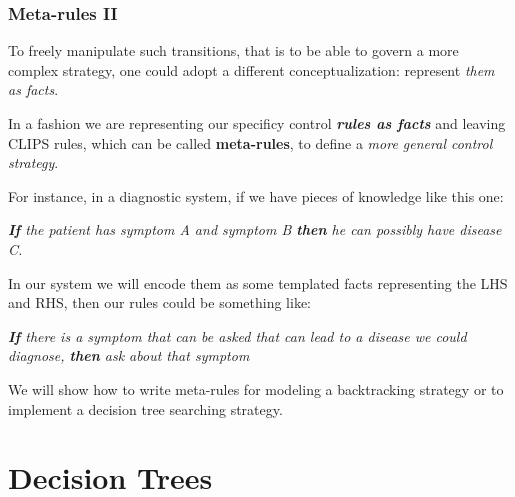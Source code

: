 \documentclass[xcolor={usenames,dvipsnames,svgnames}, compress]{beamer}
\begin{document}
\begin{frame}
  \frametitle{Meta-rules II}
  To freely manipulate such transitions, that is to be able to govern a
  more complex strategy, one could adopt a different
  conceptualization: represent \emph{them as facts}. \par
  In a fashion we are representing our specificy control \textbf{\emph{rules as
      facts}} and leaving CLIPS rules, which can be called \textbf{meta-rules},
  to define a \emph{more general control strategy}.\par

  For instance, in a diagnostic system, if we have pieces of knowledge
  like this one:\par\bigskip
  \emph{\textbf{If} the patient has symptom A and symptom B \textbf{then} he can possibly have
  disease C.}\par\bigskip
  In our system we will encode them as some templated facts
  representing the LHS and RHS, then our rules could be something like:\par\bigskip
  \emph{\textbf{If} there is a symptom that can be asked that can lead
    to a disease we could diagnose, \textbf{then} ask about that
    symptom}\par\bigskip

  We will show how to write meta-rules for modeling a backtracking
  strategy or to implement a decision tree searching strategy.
\end{frame}

\section{Decision Trees}
{
  \begin{frame}
    \sectionpage
  \end{frame}
}
\end{document}
